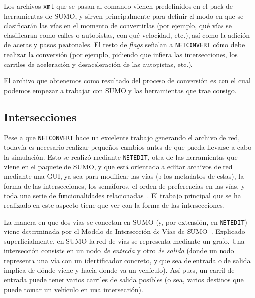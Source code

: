 
Los archivos \texttt{xml} que se pasan al comando vienen predefinidos en el pack de herramientas de SUMO, y sirven principalmente para definir el modo en que se clasificarán las vías en el momento de convertirlas (por ejemplo, qué vías se clasificarán como calles o autopistas, con qué velocidad, etc.), así como la adición de aceras y pasos peatonales. El resto de \textit{flags} señalan a \texttt{NETCONVERT} cómo debe realizar la conversión (por ejemplo, pidiendo que infiera las intersecciones, los carriles de aceleración y desaceleración de las autopistas, etc.).

El archivo que obtenemos como resultado del proceso de conversión es con el cual podemos empezar a trabajar con SUMO y las herramientas que trae consigo.

\subsection{Intersecciones}

Pese a que \texttt{NETCONVERT} hace un excelente trabajo generando el archivo de red, todavía es necesario realizar pequeños cambios antes de que pueda llevarse a cabo la simulación. Esto se realizó mediante \texttt{NETEDIT}, otra de las herramientas que viene en el paquete de SUMO, y que está orientada a editar archivos de red mediante una GUI, ya sea para modificar las vías (o los metadatos de estas), la forma de las intersecciones, los semáforos, el orden de preferencias en las vías, y toda una serie de funcionalidades relacionadas~\cite{noauthor_netedit_nodate}. El trabajo principal que se ha realizado en este aspecto tiene que ver con la forma de las intersecciones. 

La manera en que dos vías se conectan en SUMO (y, por extensión, en \texttt{NETEDIT}) viene determinada por el Modelo de Intersección de Vías de SUMO~\cite{erdmann_sumos_2014}. Explicado superficialmente, en SUMO la red de vías se representa mediante un grafo. Una intersección consiste en un nodo \textit{de entrada} y otro \textit{de salida} (donde un nodo representa una vía con un identificador concreto, y que sea de entrada o de salida implica de dónde viene y hacia donde va un vehículo). Así pues, un carril de entrada puede tener varios carriles de salida posibles (o sea, varios destinos que puede tomar un vehículo en una intersección).

